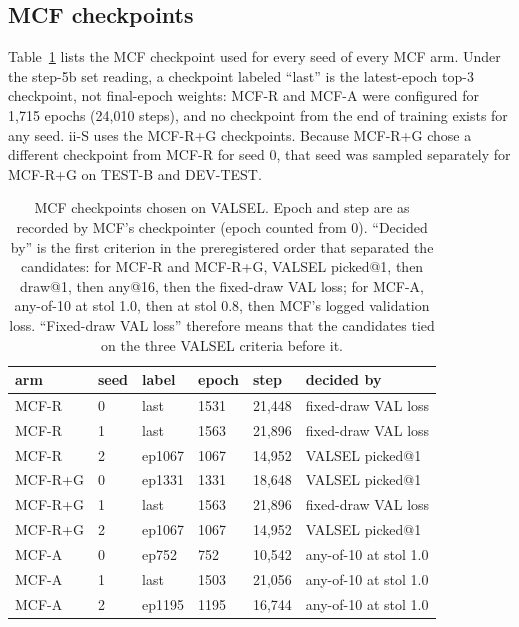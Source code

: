\subsection{MCF checkpoints}\label{si:mcfckpt}

Table~\ref{tab:si_mcf_ckpt} lists the MCF checkpoint used for every seed of every
MCF arm. Under the step-5b set reading, a checkpoint labeled ``last'' is the
latest-epoch top-3 checkpoint, not final-epoch weights: MCF-R and MCF-A were
configured for 1,715 epochs (24,010 steps), and no checkpoint from the end of
training exists for any seed. ii-S uses the MCF-R+G checkpoints. Because MCF-R+G
chose a different checkpoint from MCF-R for seed 0, that seed was sampled
separately for MCF-R+G on TEST-B and DEV-TEST.

\begin{table}
\caption{MCF checkpoints chosen on VALSEL. Epoch and step are as recorded by
MCF's checkpointer (epoch counted from 0). ``Decided by'' is the first criterion in
the preregistered order that separated the candidates: for MCF-R and MCF-R+G,
VALSEL picked@1, then draw@1, then any@16, then the fixed-draw VAL loss; for
MCF-A, any-of-10 at stol 1.0, then at stol 0.8, then MCF's logged validation
loss. ``Fixed-draw VAL loss'' therefore means that the candidates tied on the three
VALSEL criteria before it.}
\label{tab:si_mcf_ckpt}
\small
\begin{tabular}{@{}llllll@{}}
\toprule
arm & seed & label & epoch & step & decided by \\
\midrule
MCF-R & 0 & last & 1531 & 21,448 & fixed-draw VAL loss \\
MCF-R & 1 & last & 1563 & 21,896 & fixed-draw VAL loss \\
MCF-R & 2 & ep1067 & 1067 & 14,952 & VALSEL picked@1 \\
MCF-R+G & 0 & ep1331 & 1331 & 18,648 & VALSEL picked@1 \\
MCF-R+G & 1 & last & 1563 & 21,896 & fixed-draw VAL loss \\
MCF-R+G & 2 & ep1067 & 1067 & 14,952 & VALSEL picked@1 \\
MCF-A & 0 & ep752 & 752 & 10,542 & any-of-10 at stol 1.0 \\
MCF-A & 1 & last & 1503 & 21,056 & any-of-10 at stol 1.0 \\
MCF-A & 2 & ep1195 & 1195 & 16,744 & any-of-10 at stol 1.0 \\
\bottomrule
\end{tabular}
\end{table}
